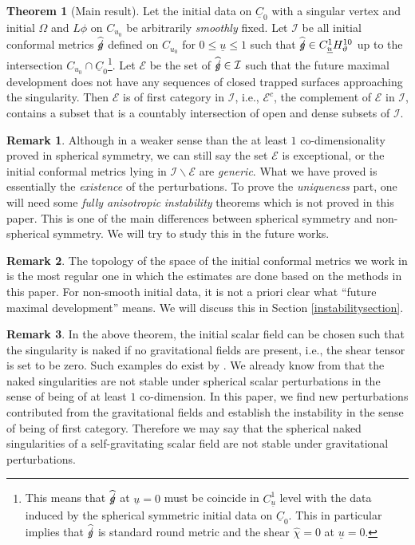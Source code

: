 \documentclass[11pt,reqno]{amsart}
\theoremstyle{definition}
\newtheorem{theorem}{Theorem}[section]
\newtheorem{remark}{Remark}[section]
\numberwithin{equation}{section}
\def\chih{\widehat{\chi}}
\def\ub{\underline{u}}
\def\Cb{\underline{C}}
\def\gs{\mbox{$g \mkern -9mu /$}}
\begin{document}
\begin{theorem}[Main result]\label{main1}
Let the initial data on $\Cb_0$ with a singular vertex and initial $\Omega$ and $L\phi$ on $C_{u_0}$ be arbitrarily \emph{smoothly} fixed. Let $\mathcal{I}$ be all initial conformal metrics $\widehat{\gs}$ defined on $C_{u_0}$ for $0\le\ub\le 1$ such that $\widehat{\gs} \in C^1_{\ub}H^{10}_\vartheta$ up to the intersection $C_{u_0}\cap\Cb_0$\footnote{This means that $\widehat{\gs}$ at $\ub=0$ must be coincide in $C_{\ub}^1$ level with the data induced by the spherical symmetric initial data on $\Cb_0$. This in particular implies that $\widehat{\gs}$ is standard round metric and the shear $\chih=0$ at $\ub=0$.}. Let $\mathcal{E}$ be the set of $\widehat{\gs} \in \mathcal{I}$ such that the future maximal development does not have any sequences of closed trapped surfaces approaching the singularity. Then $\mathcal{E}$ is of first category in $\mathcal{I}$, i.e., $\mathcal{E}^c$, the complement of $\mathcal{E}$ in $\mathcal{I}$, contains a subset that is a countably intersection of open and dense subsets of $\mathcal{I}$.
\end{theorem}

\begin{remark} \label{remark-isotropic}
 Although in a weaker sense than the at least $1$ co-dimensionality proved in spherical symmetry, we can still say the set $\mathcal{E}$ is exceptional, or the initial conformal metrics lying in $\mathcal{I}\backslash\mathcal{E}$ are \emph{generic}. What we have proved is essentially the \emph{existence} of the perturbations. To prove the \emph{uniqueness} part, one will need some \emph{fully anisotropic} \emph{instability} theorems which is not proved in this paper. This is one of the main differences between spherical symmetry and non-spherical symmetry. We will try to study this in the future works. \end{remark}
 \begin{remark}
The topology of the space of the initial conformal metrics we work in is the most regular one in which the estimates are done based on the methods in this paper. For non-smooth initial data, it is not a priori clear what ``future maximal development'' means. We will discuss this in Section \ref{instabilitysection}.
\end{remark}
\begin{remark}
In the above theorem, the initial scalar field can be chosen such that the singularity is naked if no gravitational fields are present, i.e., the shear tensor is set to be zero. Such examples do exist by \cite{Chr94}.  We already know from \cite{Chr99} that the naked singularities are not stable under spherical scalar perturbations in the sense of being of at least $1$ co-dimension. In this paper, we find new perturbations contributed from the gravitational fields and establish the instability in the sense of being of first category. Therefore we may say that the spherical naked singularities of a self-gravitating scalar field are not stable under gravitational perturbations.
\end{remark}
\end{document}
